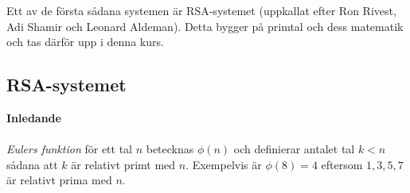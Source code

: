 \documentclass{article}
\begin{document}
Ett av de första sådana systemen är RSA-systemet (uppkallat efter Ron Rivest, Adi Shamir och Leonard Aldeman). Detta bygger på primtal och dess matematik och tas därför upp i denna kurs.

\subsection{RSA-systemet}

\textbf{Inledande}
\\ \\
\textit{Eulers funktion} för ett tal $n$ betecknas $\phi(n)$ och definierar antalet tal $k<n$ sådana att $k$ är relativt primt med $n$. Exempelvis är $\phi(8)=4$ eftersom $1,3,5,7$ är relativt prima med $n$.
\end{document}
